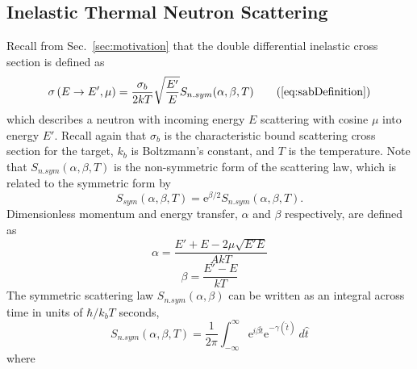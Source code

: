 \documentclass[../master.tex]{subfiles}
\begin{document}
		\subsection{Inelastic Thermal Neutron Scattering}
			Recall from Sec.~\ref{sec:motivation} that the double differential inelastic cross section is defined as 
			\begin{equation*}
				\sigma\left(E\rightarrow E',\mu\right)=\frac{\sigma_{b}}{2kT}\sqrt{\frac{E'}{E}}S_{n.sym}(\alpha,\beta,T)\tag{\ref{eq:sabDefinition}}
			\end{equation*}
			which describes a neutron with incoming energy $E$ scattering with cosine $\mu$ into energy $E'$. Recall again that $\sigma_b$ is the characteristic bound scattering cross section for the target, $k_b$ is Boltzmann's constant, and $T$ is the temperature. Note that $S_{n.sym}(\alpha,\beta,T)$ is the non-symmetric form of the scattering law, which is related to the symmetric form by 
                        \begin{equation}
                          S_{sym}(\alpha,\beta,T)=\mathrm{e}^{\beta/2}S_{n.sym}(\alpha,\beta,T).
                        \end{equation}
                        Dimensionless momentum and energy transfer, $\alpha$ and $\beta$ respectively, are defined as 
			\begin{equation}
				\alpha=\frac{E'+E-2\mu\sqrt{E'E}}{AkT}
			\end{equation}
			\begin{equation}
				\beta=\frac{E'-E}{kT}
			\end{equation}
			The symmetric scattering law $S_{n.sym}(\alpha,\beta)$ can be written as an integral across time in units of $\hbar/k_bT$ seconds, %
			\begin{equation}
				S_{n.sym}(\alpha,\beta,T)=\frac{1}{2\pi}\int_{-\infty}^{\infty}\mathrm{e}^{i\beta\hat{t}}\mathrm{e}^{-\gamma(\hat{t})}~d\hat{t}\label{eq:sabIntegralWithGamma}
			\end{equation}
			where 
\end{document}
